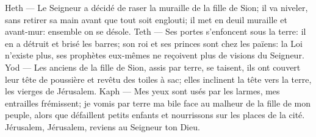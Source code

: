 Heth --- Le Seigneur a décidé de raser la muraille de la fille de Sion;
	il va niveler, sans retirer sa main avant que tout soit englouti;
	il met en deuil muraille et avant-mur: ensemble on se désole.
Teth --- Ses portes s’enfoncent sous la terre: il en a détruit et brisé les barres;
	son roi et ses princes sont chez les païens: la Loi n’existe plus,
	ses prophètes eux-mêmes ne reçoivent plus de visions du Seigneur.
Yod --- Les anciens de la fille de Sion, assis par terre, se taisent,
	ils ont couvert leur tête de poussière et revêtu des toiles à sac;
	elles inclinent la tête vers la terre, les vierges de Jérusalem.
Kaph --- Mes yeux sont usés par les larmes, mes entrailles frémissent;
	je vomis par terre ma bile face au malheur de la fille de mon peuple,
	alors que défaillent petits enfants et nourrissons sur les places de la cité.
Jérusalem, Jérusalem, reviens au Seigneur ton Dieu.
